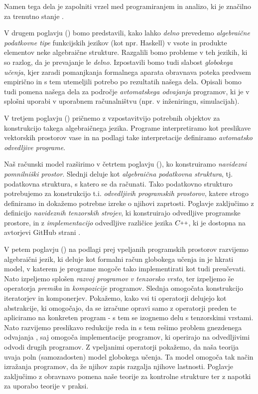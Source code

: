 \documentclass[a4paper, 12pt]{book}
\newcommand{\CC}{C\nolinebreak\hspace{-.05em}\raisebox{.4ex}{\tiny\bf +}\nolinebreak\hspace{-.10em}\raisebox{.4ex}{\tiny\bf +}}
\def\CC{{C\nolinebreak[4]\hspace{-.05em}\raisebox{.4ex}{\tiny\bf ++}}}
\begin{document}
Namen tega dela je zapolniti vrzel med programiranjem in analizo, ki je značilno za trenutno stanje \cite{AD2}. 

V drugem poglavju (\emph{}) bomo predstavili, kako lahko \emph{delno} prevedemo \emph{algebraične podatkovne tipe} funkcijskih jezikov (kot npr. Haskell) v vsote in produkte elementov neke algebraične strukture. Razgalili bomo probleme v teh jezikih, ki so razlog, da je prevajanje le \emph{delno}. Izpostavili bomo tudi slabost \emph{globokega učenja}, kjer zaradi pomanjkanja formalnega aparata obravnava poteka predvsem empirično in s tem utemeljili potrebo po rezultatih našega dela. Opisali bomo tudi pomena našega dela za področje \emph{avtomatskega odvajanja} programov, ki je v splošni uporabi v uporabnem računalništvu (npr. v inženiringu, simulacijah).

V tretjem poglavju (\emph{}) pričnemo z vzpostavitvijo potrebnih objektov za konstrukcijo takega algebraičnega jezika. Programe interpretiramo kot preslikave vektorskih prostorov vase in na podlagi take interpretacije definiramo \emph{avtomatsko odvedljive programe}. 

Naš računski model razširimo v četrtem poglavju (\emph{}), ko konstruiramo \emph{navidezni pomnilniški prostor}. Slednji deluje kot \emph{algebraična podatkovna struktura}, tj. podatkovna struktura, s katero se da računati. Tako podatkovno strukturo potrebujemo za konstrukcijo t.i. \emph{odvedljivih programskih prostorov}, katere strogo definiramo in dokažemo potrebne izreke o njihovi zaprtosti. Poglavje zaključimo z definicijo \emph{navideznih tenzorskih strojev}, ki konstruirajo odvedljive programske prostore, in z \emph{implementacijo} odvedljive različice jezika $\CC$, ki je dostopna na avtorjevi GitHub strani \cite{dC++}.

V petem poglavju (\emph{}) na podlagi prej vpeljanih programskih prostorov razvijemo algebraični jezik, ki deluje kot formalni račun globokega učenja in je hkrati model, v katerem je programe mogoče tako implementirati kot tudi preučevati. Nato izpeljemo splošen \emph{razvoj programov v tenzorsko vrsto}, ter izpeljemo še operatorja \emph{premika} in \emph{kompozicije} programov. Slednja omogočata konstrukcijo iteratorjev in komponerjev. Pokažemo, kako vsi ti operatorji delujejo kot abstrakcije, ki omogočajo, da se izračune opravi samo z operatorji preden te apliciramo na konkreten program - s tem se izognemo delu s tenzorskimi vrstami. 
Nato razvijemo preslikavo redukcije reda in s tem rešimo problem gnezdenega odvajanja \cite{AD2}, saj omogoča implementacije programov, ki operirajo na odvedljivimi odvodi drugih programov.
Z vpeljanimi operatorji pokažemo, da naša teorija uvaja poln (samozadosten) model globokega učenja. Ta model omogoča tak način izražanja programov, da že njihov zapis razgalja njihove lastnosti. Poglavje zaključimo z obravnavo pomena naše teorije za kontrolne strukture ter z napotki za uporabo teorije v praksi.
\end{document}
